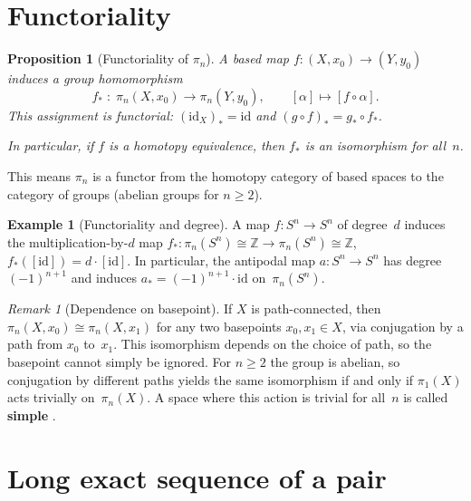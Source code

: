 \documentclass[12pt,a4paper,openany]{book}
\theoremstyle{definition}
\newtheorem{example}[definition]{Example}
\theoremstyle{plain}
\newtheorem{proposition}[definition]{Proposition}
\theoremstyle{remark}
\newtheorem{remark}[definition]{Remark}
\newcommand{\Z}{\mathbb{Z}}
\begin{document}
\section{Functoriality}\label{sec:pin-functoriality}

\begin{proposition}[Functoriality of $\pi_n$]
A based map $f\colon (X,x_0)\to(Y,y_0)$ induces a group homomorphism
\[
  f_*\;:\;\pi_n(X,x_0)\to\pi_n(Y,y_0),
  \qquad
  [\alpha]\mapsto[f\circ\alpha].
\]
This assignment is functorial:
$(\mathrm{id}_X)_*=\mathrm{id}$ and
$(g\circ f)_*=g_*\circ f_*$.

In particular, if $f$ is a homotopy equivalence, then $f_*$ is an
isomorphism for all~$n$.
\end{proposition}

This means $\pi_n$ is a functor from the homotopy category of based
spaces to the category of groups (abelian groups for $n\ge2$).

\begin{example}[Functoriality and degree]
A map $f\colon S^n\to S^n$ of degree~$d$ induces the multiplication-by-$d$
map $f_*\colon\pi_n(S^n)\cong\Z\to\pi_n(S^n)\cong\Z$,
$f_*([{\mathrm{id}}])=d\cdot[{\mathrm{id}}]$.  In particular, the
antipodal map $a\colon S^n\to S^n$ has degree $(-1)^{n+1}$ and induces
$a_*=(-1)^{n+1}\cdot\mathrm{id}$ on~$\pi_n(S^n)$.
\end{example}

\begin{remark}[Dependence on basepoint]
If $X$ is path-connected, then $\pi_n(X,x_0)\cong\pi_n(X,x_1)$ for
any two basepoints $x_0,x_1\in X$, via conjugation by a path from
$x_0$ to~$x_1$.  This isomorphism depends on the choice of path, so
the basepoint cannot simply be ignored.  For $n\ge2$ the group is
abelian, so conjugation by different paths yields the same isomorphism
if and only if $\pi_1(X)$ acts trivially on~$\pi_n(X)$.  A space where
this action is trivial for all~$n$ is called \textbf{simple}%
.
\end{remark}

\section{Long exact sequence of a pair}\label{sec:les-pair}
\end{document}
